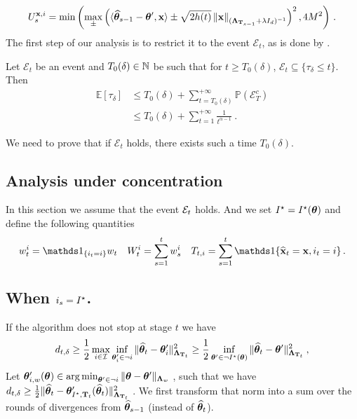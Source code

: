 \begin{equation}
\label{eq:def_ucb_br_general_nc}
U_s^{{\bf x},i} = \min\left(\max_\pm \left( \langle \widehat{{\boldsymbol \theta}}_{s-1} - {\boldsymbol \theta}',{\bf x}\rangle \pm \sqrt{2 h(t)} \left\lVert{\bf x}\right\rVert_{({\boldsymbol \Lambda}_{{\bf T}_{s-1}}+ \lambda I_d)^{-1}} \right)^2,4M^2\right)\,.
\end{equation}
The first step of our analysis is to restrict it to the event $\mathcal E_t$, as is done by \citet{garivier2016tracknstop,degenne2019game}.
\begin{lemma}
Let $\mathcal E_t$ be an event and $T_0(\delta) \in {\mathbb N}$ be such that for $t\ge T_0(\delta)$, $\mathcal E_t \subseteq \{\tau_\delta \le t\}$. Then
\begin{align*}
\mathbb{E}[\tau_\delta]
&\le T_0(\delta) + \sum_{t=T_0(\delta)}^{+\infty} \mathbb{P}(\mathcal E_T^c)
\\
&\le T_0(\delta) + \sum_{t=1}^{+\infty} \frac{1}{t^{\alpha-1}}\: .
\end{align*}
\end{lemma}

We need to prove that if $\mathcal E_t$ holds, there exists such a time $T_0(\delta)$.

\subsection{Analysis under concentration}
In this section we assume that the event $\mathcal{E}_t$ holds. And we set $I^\star=I^\star({\boldsymbol \theta})$ and define the following quantities
\[
w_t^i = \ind_{\{i_t = i\}}w_t \quad W_t^i = \sum_{s=1}^t w_s^i\quad T_{t,i} = \sum_{s=1}^t \ind{\{\hbx_t=\bx,i_t=i\}}\,.
\]

\subsection{When $i_s = I^\star$.}
If the algorithm does not stop at stage $t$
we have
\begin{align*}
d_{t,\delta}
\ge \frac{1}{2}\max_{i\in\mathcal{I}} \inf_{{\boldsymbol \theta}'_i \in \neg i}\Vert \widehat{{\boldsymbol \theta}}_t - {\boldsymbol \theta}'_i \Vert_{{\boldsymbol \Lambda}_{{\bf T}_t}}^2
\geq  \frac{1}{2} \inf_{{\boldsymbol \theta}' \in \neg I^\star({\boldsymbol \theta})}\Vert \widehat{{\boldsymbol \theta}}_t - {\boldsymbol \theta}' \Vert_{{\boldsymbol \Lambda}_{{\bf T}_t}}^2
\: ,
\end{align*}
Let ${\boldsymbol \theta}'_{i,w}({\boldsymbol \theta}) \in \operatorname*{arg\,min}_{{\boldsymbol \theta}' \in \neg i} \Vert {\boldsymbol \theta} - {\boldsymbol \theta}' \Vert_{{\boldsymbol \Lambda}_{w}}$ , such that we have $d_{t,\delta} \ge \frac{1}{2}\Vert \widehat{{\boldsymbol \theta}}_t - {\boldsymbol \theta}'_{I^\star,{\bf T}_t}(\widehat{{\boldsymbol \theta}}_t) \Vert_{{\boldsymbol \Lambda}_{{\bf T}_t}}^2$ . We first transform that norm into a sum over the rounds of divergences from $\widehat{{\boldsymbol \theta}}_{s-1}$ (instead of $\widehat{{\boldsymbol \theta}}_t$).

